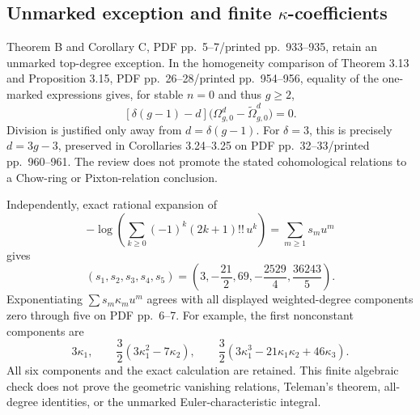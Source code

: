 \documentclass[10pt]{article}
\begin{document}
\subsection*{Unmarked exception and finite \(\kappa\)-coefficients}
Theorem B and Corollary C, PDF pp. 5–7/printed pp. 933–935, retain an unmarked top-degree exception. In the homogeneity comparison of Theorem 3.13 and Proposition 3.15, PDF pp. 26–28/printed pp. 954–956, equality of the one-marked expressions gives, for stable \(n=0\) and thus \(g\ge2\), \[[\delta(g-1)-d]\bigl(\Omega_{g,0}^{d}
                   -\widetilde\Omega_{g,0}^{d}\bigr)=0.\] Division is justified only away from \(d=\delta(g-1)\). For \(\delta=3\), this is precisely \(d=3g-3\), preserved in Corollaries 3.24–3.25 on PDF pp. 32–33/printed pp. 960–961. The review does not promote the stated cohomological relations to a Chow-ring or Pixton-relation conclusion.\par
Independently, exact rational expansion of \[-\log\left(\sum_{k\ge0}(-1)^k(2k+1)!!\,u^k\right)
 =\sum_{m\ge1}s_m u^m\] gives \[(s_1,s_2,s_3,s_4,s_5)
 =\left(3,-\frac{21}{2},69,-\frac{2529}{4},
                        \frac{36243}{5}\right).\] Exponentiating \(\sum s_m\kappa_m u^m\) agrees with all displayed weighted-degree components zero through five on PDF pp. 6–7. For example, the first nonconstant components are \[3\kappa_1,\qquad
 \frac32(3\kappa_1^2-7\kappa_2),\qquad
 \frac32(3\kappa_1^3-21\kappa_1\kappa_2+46\kappa_3).\] All six components and the exact calculation are retained. This finite algebraic check does not prove the geometric vanishing relations, Teleman’s theorem, all-degree identities, or the unmarked Euler-characteristic integral.\par
\end{document}
